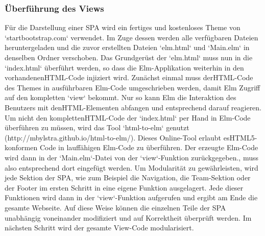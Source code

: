 \subsubsection{Überführung des Views}
\label{sec:Überführung des Views}
Für die Darstellung einer SPA wird ein fertiges und kostenloses Theme von `startbootstrap.com` verwendet. Im Zuge dessen werden alle verfügbaren Dateien heruntergeladen und die zuvor erstellten Dateien `elm.html` und `Main.elm` in denselben Ordner verschoben.
Das Grundgerüst der `elm.html` muss nun in die `index.html` überführt werden, so dass die Elm-Applikation weiterhin in den vorhandenen\ac{HTML}-Code injiziert wird.
Zunächst einmal muss der\ac{HTML}-Code des Themes in ausführbaren Elm-Code umgeschrieben werden, damit Elm Zugriff auf den kompletten `view` bekommt. Nur so kann Elm die Interaktion des Benutzers mit den\ac{HTML}-Elementen abfangen und entsprechend darauf reagieren. Um nicht den kompletten\ac{HTML}-Code der `index.html` per Hand in Elm-Code überführen zu müssen, wird das Tool `html-to-elm` genutzt (http://mbylstra.github.io/html-to-elm/). Dieses Online-Tool erlaubt es\ac{HTML}5-konformen Code in lauffähigen Elm-Code zu überführen. Der erzeugte Elm-Code wird dann in der `Main.elm`-Datei von der `view`-Funktion zurückgegeben., muss also entsprechend dort eingefügt werden.
Um Modularität zu gewährleisten, wird jede Sektion der SPA, wie zum Beispiel die Navigation, die Team-Sektion oder der Footer im ersten Schritt in eine eigene Funktion ausgelagert. Jede dieser Funktionen wird dann in der `view`-Funktion aufgerufen und ergibt am Ende die gesamte Webseite. Auf diese Weise können die einzelnen Teile der SPA unabhängig voneinander modifiziert und auf Korrektheit überprüft werden. Im nächsten Schritt wird der gesamte View-Code modularisiert.


